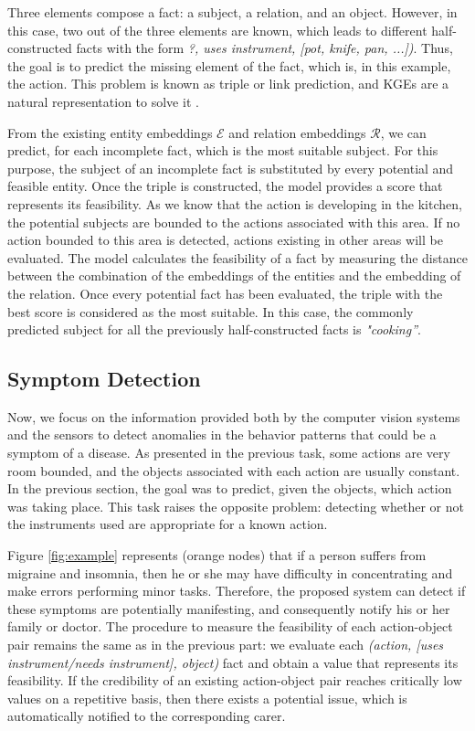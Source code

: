 Three elements compose a fact:  a subject, a relation, and an object. However, in this case, two out of the three elements are known, which leads to different half-constructed facts with the form \textit{?, uses instrument, [pot, knife, pan, ...])}. Thus, the goal is to predict the missing element of the fact, which is, in this example, the action. This problem is known as triple or link prediction, and KGEs are a natural representation to solve it \citep{WangMWG17}.

From the existing entity embeddings $\mathcal{E}$ and relation embeddings $\mathcal{R}$, we can predict, for each incomplete fact, which is the most suitable subject. For this purpose, the subject of an incomplete fact is substituted by every potential and feasible entity. Once the triple is constructed, the model provides a score that represents its feasibility. As we know that the action is developing in the kitchen, the potential subjects are bounded to the actions associated with this area. If no action bounded to this area is detected, actions existing in other areas will be evaluated. The model calculates the feasibility of a fact by measuring the distance between the combination of the embeddings of the entities and the embedding of the relation. Once every potential fact has been evaluated, the triple with the best score is considered as the most suitable. In this case, the commonly predicted subject for all the previously half-constructed facts is \textit{"cooking''}.


\subsection{Symptom Detection} 
Now, we focus on the information provided both by the computer vision systems and the sensors to detect anomalies in the behavior patterns that could be a symptom of a disease. As presented in the previous task, some actions are very room bounded, and the objects associated with each action are usually constant. In the previous section, the goal was to predict, given the objects, which action was taking place. This task raises the opposite problem: detecting whether or not the instruments used are appropriate for a known action.

Figure \ref{fig:example} represents (orange nodes) that if a person suffers from migraine and insomnia, then he or she may have difficulty in concentrating and make errors performing minor tasks. Therefore, the proposed system can detect if these symptoms are potentially manifesting, and consequently notify his or her family or doctor. The procedure to measure the feasibility of each action-object pair remains the same as in the previous part: we evaluate each \textit{(action, [uses instrument/needs instrument], object)} fact and obtain a value that represents its feasibility. If the credibility of an existing action-object pair reaches critically low values on a repetitive basis, then there exists a potential issue, which is automatically notified to the corresponding carer.

